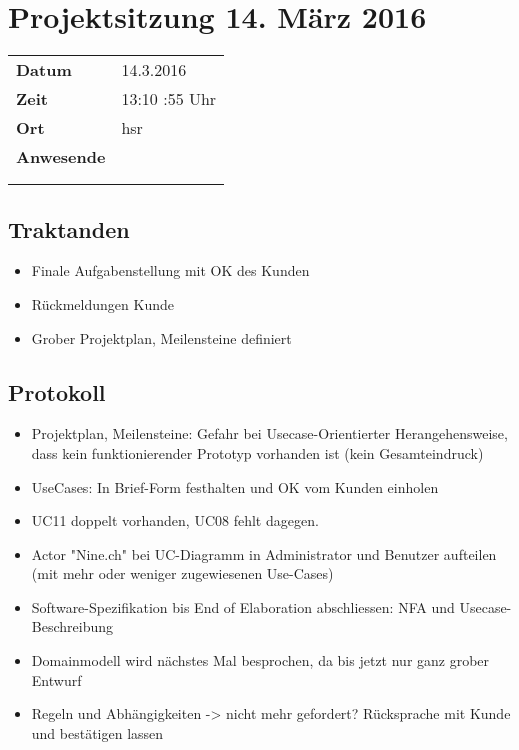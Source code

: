 \documentclass[class=scrbook,crop=false]{standalone}
\begin{document}
	
	\section{Projektsitzung 14. März 2016}
	
	\begin{tabular}{ll}
		\textbf{Datum} & 14.3.2016 \\
		\textbf{Zeit} & 13:10 \textendash 13:55 Uhr \\
		\textbf{Ort} & \acs{hsr} \\
		\textbf{Anwesende} & \proff \\ & \ubos \\ & \pchr
	\end{tabular}
	
	\subsection*{Traktanden}
	
	\begin{itemize}
		\item Finale Aufgabenstellung mit OK des Kunden
        \item Rückmeldungen Kunde
        \item Grober Projektplan, Meilensteine definiert
	\end{itemize}
	
	\subsection*{Protokoll}
	
	\begin{itemize}
		\item Projektplan, Meilensteine: Gefahr bei Usecase-Orientierter Herangehensweise, dass kein funktionierender Prototyp vorhanden ist (kein Gesamteindruck)
		\item UseCases: In Brief-Form festhalten und OK vom Kunden einholen
		\item UC11 doppelt vorhanden, UC08 fehlt dagegen.
		\item Actor "Nine.ch" bei UC-Diagramm in Administrator und Benutzer aufteilen (mit mehr oder weniger zugewiesenen Use-Cases)
		\item Software-Spezifikation bis End of Elaboration abschliessen: NFA und Usecase-Beschreibung
		\item Domainmodell wird nächstes Mal besprochen, da bis jetzt nur ganz grober Entwurf
		\item Regeln und Abhängigkeiten -> nicht mehr gefordert? Rücksprache mit Kunde und bestätigen lassen
	\end{itemize}
	
\end{document}
